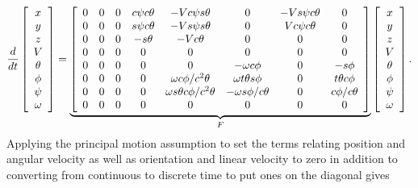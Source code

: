 {\scriptsize
\begin{align}
\label{eq:kfjacobianresult}
\frac{d}{dt}\left[\begin{array}{c}
x \\ y \\ z \\ V \\ \theta \\ \phi \\ \psi \\ \omega
\end{array}\right] =
\underbrace{\left[\begin{array}{c c c c c c c c}
0 & 0 & 0 & c\psi c\theta & -V c\psi s\theta               & 0                     & -V s\psi c\theta & 0 \\
0 & 0 & 0 & s\psi c\theta & -V s\psi s\theta               & 0                     & V c\psi c\theta  & 0 \\
0 & 0 & 0 & -s\theta      & -V c\theta                     & 0                     & 0                & 0 \\
0 & 0 & 0 & 0             & 0                              & 0                     & 0                & 0 \\
0 & 0 & 0 & 0             & 0                              & -\omega c\phi         & 0                & -s\phi \\
0 & 0 & 0 & 0             & \omega c\phi/c^2\theta         & \omega t\theta s\phi  & 0                & t\theta c\phi \\
0 & 0 & 0 & 0             & \omega s\theta c\phi/c^2\theta & -\omega s\phi/c\theta & 0                & c\phi/c\theta \\
0 & 0 & 0 & 0             & 0                              & 0                     & 0                & 0
\end{array}\right]}_{F}
\left[\begin{array}{c}
x \\ y \\ z \\ V \\ \theta \\ \phi \\ \psi \\ \omega
\end{array}\right].
\end{align}
}
Applying the principal motion assumption to set the terms relating position and angular velocity as well as orientation and linear velocity to zero in addition to converting from continuous to discrete time to put ones on the diagonal gives

